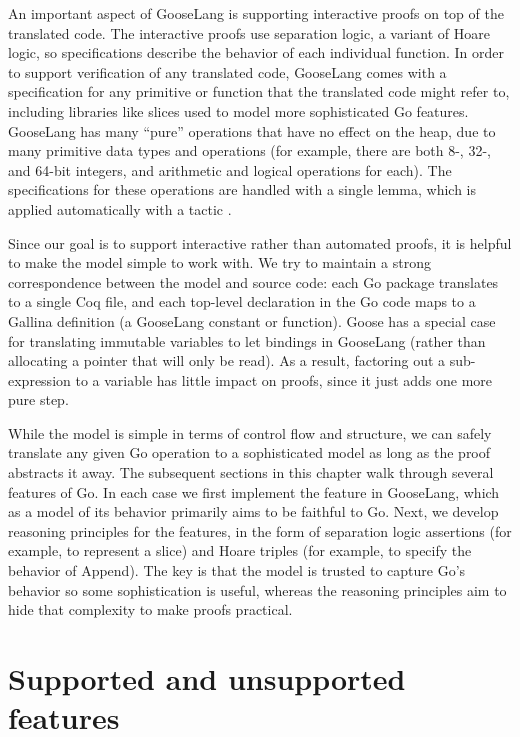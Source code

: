 An important aspect of GooseLang is supporting interactive proofs on top
of the translated code. The interactive proofs use separation logic, a
variant of Hoare logic, so specifications describe the behavior of each
individual function. In order to support verification of any translated
code, GooseLang comes with a specification for any primitive or function
that the translated code might refer to, including libraries like slices
used to model more sophisticated Go features. GooseLang has many
``pure'' operations that have no effect on the heap, due to many
primitive data types and operations (for example, there are both 8-,
32-, and 64-bit integers, and arithmetic and logical operations for
each). The specifications for these operations are handled with a single
lemma, which is applied automatically with a tactic .

Since our goal is to support interactive rather than automated proofs,
it is helpful to make the model simple to work with. We try to maintain
a strong correspondence between the model and source code: each Go
package translates to a single Coq file, and each top-level declaration
in the Go code maps to a Gallina definition (a GooseLang constant or
function). Goose has a special case for translating immutable variables
to let bindings in GooseLang (rather than allocating a pointer that will
only be read). As a result, factoring out a sub-expression to a variable
has little impact on proofs, since it just adds one more pure step.

While the model is simple in terms of control flow and structure, we can
safely translate any given Go operation to a sophisticated model as long
as the proof abstracts it away. The subsequent sections in this chapter
walk through several features of Go. In each case we first implement the
feature in GooseLang, which as a model of its behavior primarily aims to
be faithful to Go. Next, we develop reasoning principles for the
features, in the form of separation logic assertions (for example, to
represent a slice) and Hoare triples (for example, to specify the
behavior of Append). The key is that the model is trusted to capture
Go's behavior so some sophistication is useful, whereas the reasoning
principles aim to hide that complexity to make proofs practical.

\section{Supported and unsupported
features}

